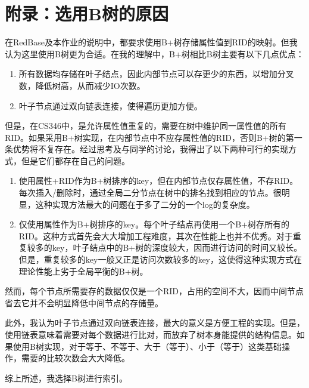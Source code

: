 \documentclass{article}
\begin{document}
\section{附录：选用B树的原因}
在RedBase及本作业的说明中，都要求使用B+树存储属性值到RID的映射。但我认为这里使用B树更为合适。在我的理解中，B+树相比B树主要有以下几点优点：
\begin{enumerate}
    \item 所有数据均存储在叶子结点，因此内部节点可以存更少的东西，以增加分叉数，降低树高，从而减少IO次数。
    \item 叶子节点通过双向链表连接，使得遍历更加方便。
\end{enumerate}

但是，在CS346中，是允许属性值重复的，需要在树中维护同一属性值的所有RID。如果采用B+树实现，在内部节点中不应存属性值的RID，否则B+树的第一条优势将不复存在。经过思考及与同学的讨论，我得出了以下两种可行的实现方式，但是它们都存在自己的问题。

\begin{enumerate}
    \item 使用属性+RID作为B+树排序的key，但在内部节点仅存属性值，不存RID。每次插入/删除时，通过全局二分节点在树中的排名找到相应的节点。很明显，这种实现方法最大的问题在于多了二分的一个log的复杂度。
    \item 仅使用属性作为B+树排序的key。每个叶子结点再使用一个B+树存所有的RID。这种方式首先会大大增加工程难度，其次在性能上也并不优秀。对于重复较多的key，叶子结点中的B+树的深度较大，因而进行访问的时间又较长。但是，重复较多的key一般又正是访问次数较多的key，这使得这种实现方式在理论性能上劣于全局平衡的B+树。
\end{enumerate}

然而，每个节点所需要存的数据仅仅是一个RID，占用的空间不大，因而中间节点省去它并不会明显降低中间节点的存储量。

此外，我认为叶子节点通过双向链表连接，最大的意义是方便工程的实现。但是，使用链表意味着需要对每个数据进行比对，而放弃了树本身能提供的结构信息。如果使用B树实现，对于等于、不等于、大于（等于）、小于（等于）这类基础操作，需要的比较次数会大大降低。

综上所述，我选择B树进行索引。
\end{document}
